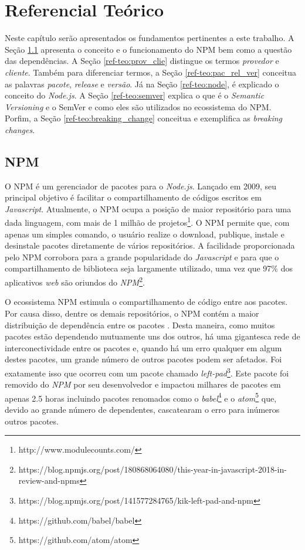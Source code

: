 \chapter{Referencial Teórico}
\label{cap:ref-teorico}
Neste capítulo serão apresentados os fundamentos pertinentes a este trabalho. A Seção \ref{ref-teo:npm} apresenta o conceito e o funcionamento do \gls{NPM} bem como a questão das dependências. A Seção \ref{ref-teo:prov_clie} distingue os termos \textit{provedor} e \textit{cliente}. Também para diferenciar termos, a Seção \ref{ref-teo:pac_rel_ver} conceitua as palavras \textit{pacote}, \textit{release} e \textit{versão}. Já na Seção \ref{ref-teo:node}, é explicado o conceito do \textit{Node.js}. A Seção \ref{ref-teo:semver} explica o que é o \textit{Semantic Versioning} e o \gls{SemVer} e como eles são utilizados no ecossistema do \gls{NPM}. Porfim, a Seção \ref{ref-teo:breaking_change} conceitua e exemplifica as \textit{breaking changes}.

\section{\gls{NPM}}
\label{ref-teo:npm}
O \gls{NPM} é um gerenciador de pacotes para o \textit{Node.js}. Lançado em 2009, seu principal objetivo é facilitar o compartilhamento de códigos escritos em \textit{Javascript}. Atualmente, o \gls{NPM} ocupa a posição de maior repositório para uma dada linguagem, com mais de 1 milhão de projetos\footnote{http://www.modulecounts.com/}. O \gls{NPM} permite que, com apenas um simples comando, o usuário realize o download, publique, instale e desinstale pacotes diretamente de vários repositórios. A facilidade proporcionada pelo \gls{NPM} corrobora para a grande popularidade do \textit{Javascript} e para que o compartilhamento de biblioteca seja largamente utilizado, uma vez que 97\% dos aplicativos \textit{web} são oriundos do \textit{NPM}\footnote{https://blog.npmjs.org/post/180868064080/this-year-in-javascript-2018-in-review-and-npms}.

O ecossistema \gls{NPM} estimula o compartilhamento de código entre aos pacotes. Por causa disso, dentre os demais repositórios, o \gls{NPM} contém a maior distribuição de dependência entre os pacotes \cite{teorical_reference:npm_2}. Desta maneira, como muitos pacotes estão dependendo mutuamente uns dos outros, há uma gigantesca rede de interconectividade entre os pacotes e, quando há um erro qualquer em algum destes pacotes, um grande número de outros pacotes podem ser afetados. Foi exatamente isso que ocorreu com um pacote chamado \textit{left-pad}\footnote{https://blog.npmjs.org/post/141577284765/kik-left-pad-and-npm}. Este pacote foi removido do \textit{NPM} por seu desenvolvedor e impactou milhares de pacotes em apenas 2.5 horas incluindo pacotes renomados como o \textit{babel}\footnote{https://github.com/babel/babel} e o \textit{atom}\footnote{https://github.com/atom/atom} que, devido ao grande número de dependentes, cascatearam o erro para inúmeros outros pacotes.

